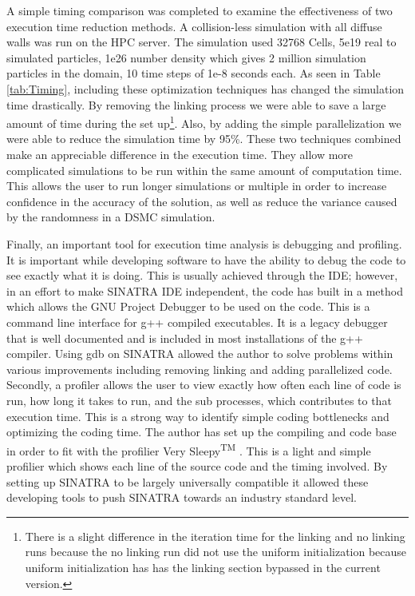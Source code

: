\indent A simple timing comparison was completed to examine the effectiveness of two execution time reduction methods. A collision-less simulation with all diffuse walls was run on the HPC server. The simulation used 32768 Cells, 5e19 real to simulated particles, 1e26 number density which gives 2 million simulation particles in the domain, 10 time steps of 1e-8 seconds each. As seen in Table \ref{tab:Timing}, including these optimization techniques has changed the simulation time drastically. By removing the linking process we were able to save a large amount of time during the set up\footnote{There is a slight difference in the iteration time for the linking and no linking runs because the no linking run did not use the uniform initialization because uniform initialization has has the linking section bypassed in the current version.}. Also, by adding the simple parallelization we were able to reduce the simulation time by 95\%. These two techniques combined make an appreciable difference in the execution time. They allow more complicated simulations to be run within the same amount of computation time. This allows the user to run longer simulations or multiple in order to increase confidence in the accuracy of the solution, as well as reduce the variance caused by the randomness in a DSMC simulation. \par

\indent Finally, an important tool for execution time analysis is debugging and profiling. It is important while developing software to have the ability to debug the code to see exactly what it is doing. This is usually achieved through the IDE; however, in an effort to make SINATRA IDE independent, the code has built in a method which allows the GNU Project Debugger to be used on the code\cite{gdb}. This is a command line interface for g++ compiled executables. It is a legacy debugger that is well documented and is included in most installations of the g++ compiler. Using gdb on SINATRA allowed the author to solve problems within various improvements including removing linking and adding parallelized code. Secondly, a profiler allows the user to view exactly how often each line of code is run, how long it takes to run, and the sub processes, which contributes to that execution time. This is a strong way to identify simple coding bottlenecks and optimizing the coding time. The author has set up the compiling and code base in order to fit with the profilier Very Sleepy\textsuperscript{TM} \cite{Sleepy}. This is a light and simple profilier which shows each line of the source code and the timing involved. By setting up SINATRA to be largely universally compatible it allowed these developing tools to push SINATRA towards an industry standard level. \par



